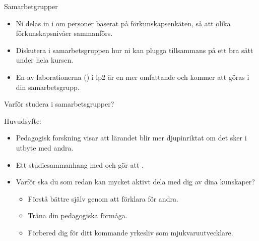\fi

\ifkompendium\else



\begin{SlideExtra}{Samarbetgrupper}\footnotesize
\begin{itemize}
\item Ni delas in i  om  personer baserat på förkunskapsenkäten, så att olika förkunskapsnivåer sammanförs.
\item Diskutera i samarbetsgruppen hur ni kan plugga tillsammans på ett bra sätt under hela kursen.
\item En av laborationerna () i lp2 är en mer omfattande  och kommer att göras i din samarbetsgrupp. \\ \vspace{1em}
\end{itemize}
\end{SlideExtra}



\begin{SlideExtra}{Varför studera i samarbetsgrupper?}

Huvudsyfte: 

\begin{itemize}
\item Pedagogisk forskning visar att lärandet blir mer djupinriktat om det sker i utbyte med andra.
\item Ett studiesammanhang med  och  gör att .
\item Varför ska du som redan kan mycket aktivt dela med dig av dina kunskaper?
\begin{itemize}
\item Förstå bättre själv genom att förklara för andra.
\item Träna din pedagogiska förmåga.
\item Förbered dig för ditt kommande yrkesliv som mjukvaruutvecklare.
\end{itemize}
\end{itemize}
\end{SlideExtra}


